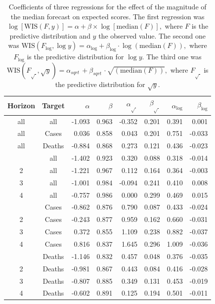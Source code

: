 \documentclass{article}
\begin{document}
\begin{table}
\centering
\begin{tabular}{ccrrrrrr}
\toprule
Horizon & Target & $\alpha$ & $\beta$ & $\alpha_\sqrt{\ }$ & $\beta_\sqrt{\ }$ & $\alpha_\log$ & $\beta_\log$ \\
\midrule
all & all & -1.093 & 0.963 & -0.352 & 0.201 & 0.391 & 0.001\\
\addlinespace
all & Cases & 0.036 & 0.858 & 0.043 & 0.201 & 0.751 & -0.033\\
all & Deaths & -0.884 & 0.868 & 0.273 & 0.121 & 0.436 & -0.023\\
\addlinespace
1 & all & -1.402 & 0.923 & 0.320 & 0.088 & 0.318 & -0.014\\
2 & all & -1.221 & 0.967 & 0.112 & 0.164 & 0.364 & -0.003\\
3 & all & -1.001 & 0.984 & -0.094 & 0.241 & 0.410 & 0.008\\
4 & all & -0.757 & 0.986 & 0.000 & 0.299 & 0.469 & 0.015\\
\addlinespace
1 & Cases & -0.862 & 0.876 & 0.790 & 0.087 & 0.433 & -0.024\\
2 & Cases & -0.243 & 0.877 & 0.959 & 0.162 & 0.660 & -0.031\\
3 & Cases & 0.372 & 0.855 & 1.109 & 0.238 & 0.882 & -0.037\\
4 & Cases & 0.816 & 0.837 & 1.645 & 0.296 & 1.009 & -0.036\\
\addlinespace
1 & Deaths & -1.146 & 0.832 & 0.457 & 0.048 & 0.376 & -0.035\\
2 & Deaths & -0.981 & 0.867 & 0.443 & 0.084 & 0.416 & -0.028\\
3 & Deaths & -0.807 & 0.885 & 0.349 & 0.131 & 0.453 & -0.019\\
4 & Deaths & -0.602 & 0.891 & 0.125 & 0.194 & 0.501 & -0.011\\
\bottomrule
\end{tabular}
\caption{Coefficients of three regressions for the effect of the magnitude of the median forecast on expected scores. The first regression was 
$\log[\text{WIS}(F, y)] = \alpha + \beta \times \log[\text{median}(F)], $ where $F$ is the predictive distribution and $y$ the observed value. The second one was 
$\text{WIS}(F_{\log}, \log y) = \alpha_{\log} + \beta_{\log} \cdot \log{(\text{median}(F))},$ where $F_{\log}$ is the predictive distribution for $\log y$. The third one was $\text{WIS}(F_{\sqrt{\ }}, \sqrt{y}) = \alpha_{sqrt{\ }} + \beta_{sqrt{\ }} \cdot \sqrt{(\text{median}(F))},$ where $F_{\sqrt{\ }}$ is the predictive distribution for $\sqrt{y}$.
}
\label{tab:HUB-regression}
\end{table}
\end{document}
